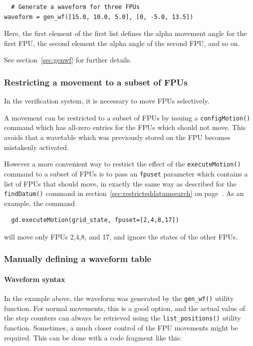\documentclass[11pt,a4paper]{scrartcl}
\begin{document}
\begin{verbatim}
  # Generate a waveform for three FPUs
waveform = gen_wf([15.0, 10.0, 5.0], [0, -5.0, 13.5])
\end{verbatim}

Here, the first element of the first list
defines the alpha movement angle for the
first FPU, the second element the alpha
angle of the second FPU, and so on.

See section~\ref{sec:genwf} for further details.

\subsubsection{Restricting a movement to a subset of FPUs}
  In the verification system, it is necessary
to move FPUs selectively.

A movement can be restricted to a subset of FPUs by issuing a
\texttt{configMotion()} command which has all-zero entries for the FPUs
which should not move. This avoids that a wavetable which was
previously stored on the FPU becomes mistakenly activated.

However a more convenient way to restrict the effect
of the \texttt{executeMotion()} command to a
subset of FPUs is to pass an \texttt{fpuset} parameter
which contains a list of FPUs that should move,
in exactly the same way as described for the \texttt{findDatum()}
command in section~\ref{sec:restricteddatumsearch}
on page~\pageref{sec:restricteddatumsearch}. As an example,
the command
\begin{verbatim}
  gd.executeMotion(grid_state, fpuset=[2,4,8,17])
\end{verbatim}
will move only FPUs 2,4,8, and 17, and ignore the states of the other
FPUs.


\subsubsection{Manually defining a waveform table}
\label{sec:waveform_rules}
\paragraph{Waveform syntax}

In the example above, the waveform was generated by the
\texttt{gen\_wf()} utility function.  For normal movements, this is a
good option, and the actual value of the step counters can always be
retrieved using the \texttt{list\_positions()} utility
function. Sometimes, a much closer control of the FPU movements might
be required. This can be done with a code fragment like this:
\end{document}
